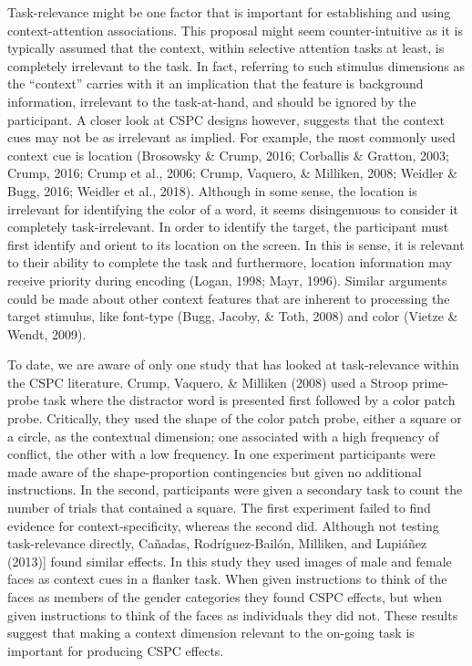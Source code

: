 \documentclass[english,,man,floatsintext]{apa6}
\begin{document}
Task-relevance might be one factor that is important for establishing and using context-attention associations. This proposal might seem counter-intuitive as it is typically assumed that the context, within selective attention tasks at least, is completely irrelevant to the task. In fact, referring to such stimulus dimensions as the \enquote{context} carries with it an implication that the feature is background information, irrelevant to the task-at-hand, and should be ignored by the participant. A closer look at CSPC designs however, suggests that the context cues may not be as irrelevant as implied. For example, the most commonly used context cue is location (Brosowsky \& Crump, 2016; Corballis \& Gratton, 2003; Crump, 2016; Crump et al., 2006; Crump, Vaquero, \& Milliken, 2008; Weidler \& Bugg, 2016; Weidler et al., 2018). Although in some sense, the location is irrelevant for identifying the color of a word, it seems disingenuous to consider it completely task-irrelevant. In order to identify the target, the participant must first identify and orient to its location on the screen. In this is sense, it is relevant to their ability to complete the task and furthermore, location information may receive priority during encoding (Logan, 1998; Mayr, 1996). Similar arguments could be made about other context features that are inherent to processing the target stimulus, like font-type (Bugg, Jacoby, \& Toth, 2008) and color (Vietze \& Wendt, 2009).

To date, we are aware of only one study that has looked at task-relevance within the CSPC literature. Crump, Vaquero, \& Milliken (2008) used a Stroop prime-probe task where the distractor word is presented first followed by a color patch probe. Critically, they used the shape of the color patch probe, either a square or a circle, as the contextual dimension; one associated with a high frequency of conflict, the other with a low frequency. In one experiment participants were made aware of the shape-proportion contingencies but given no additional instructions. In the second, participants were given a secondary task to count the number of trials that contained a square. The first experiment failed to find evidence for context-specificity, whereas the second did. Although not testing task-relevance directly, Cañadas, Rodríguez-Bailón, Milliken, and Lupiáñez (2013){]} found similar effects. In this study they used images of male and female faces as context cues in a flanker task. When given instructions to think of the faces as members of the gender categories they found CSPC effects, but when given instructions to think of the faces as individuals they did not. These results suggest that making a context dimension relevant to the on-going task is important for producing CSPC effects.
\end{document}
